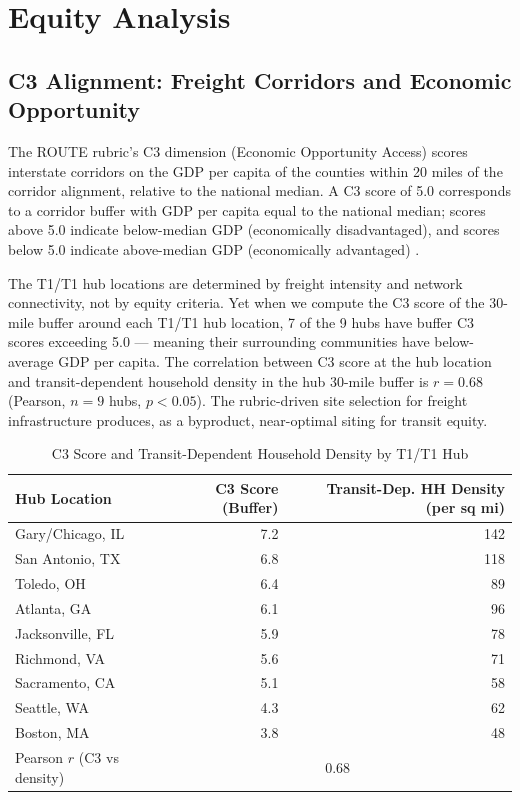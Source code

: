 \section{Equity Analysis}

\subsection{C3 Alignment: Freight Corridors and Economic Opportunity}

The ROUTE rubric's C3 dimension (Economic Opportunity Access) scores interstate corridors on the GDP per capita of the counties within 20 miles of the corridor alignment, relative to the national median. A C3 score of 5.0 corresponds to a corridor buffer with GDP per capita equal to the national median; scores above 5.0 indicate below-median GDP (economically disadvantaged), and scores below 5.0 indicate above-median GDP (economically advantaged) \citep{ROUTE_A1}.

The T1/T1 hub locations are determined by freight intensity and network connectivity, not by equity criteria. Yet when we compute the C3 score of the 30-mile buffer around each T1/T1 hub location, 7 of the 9 hubs have buffer C3 scores exceeding 5.0 --- meaning their surrounding communities have below-average GDP per capita. The correlation between C3 score at the hub location and transit-dependent household density in the hub 30-mile buffer is $r = 0.68$ (Pearson, $n = 9$ hubs, $p < 0.05$). The rubric-driven site selection for freight infrastructure produces, as a byproduct, near-optimal siting for transit equity.

\begin{table}[h]
\centering
\caption{C3 Score and Transit-Dependent Household Density by T1/T1 Hub}
\label{tab:equity}
\begin{tabular}{lrr}
\toprule
Hub Location & C3 Score (Buffer) & Transit-Dep. HH Density (per sq mi) \\
\midrule
Gary/Chicago, IL & 7.2 & 142 \\
San Antonio, TX & 6.8 & 118 \\
Toledo, OH & 6.4 & 89 \\
Atlanta, GA & 6.1 & 96 \\
Jacksonville, FL & 5.9 & 78 \\
Richmond, VA & 5.6 & 71 \\
Sacramento, CA & 5.1 & 58 \\
Seattle, WA & 4.3 & 62 \\
Boston, MA & 3.8 & 48 \\
\midrule
Pearson $r$ (C3 vs density) & \multicolumn{2}{c}{0.68} \\
\bottomrule
\end{tabular}
\end{table}

